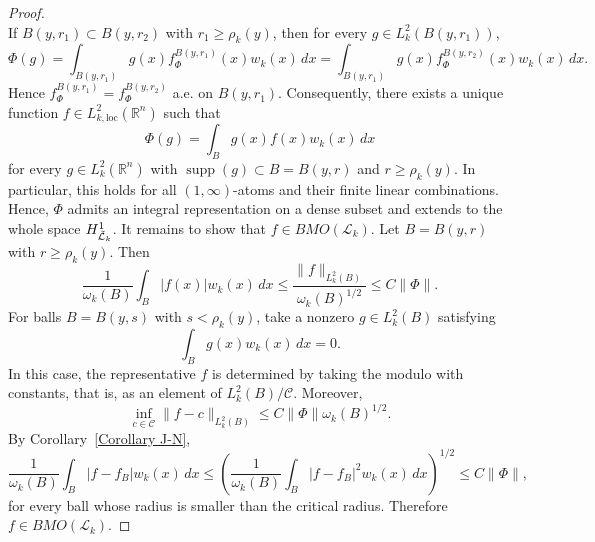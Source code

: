 \documentclass[11pt, reqno]{amsproc}
\theoremstyle{definition}
\theoremstyle{remark}
\numberwithin{equation}{section}
\begin{document}
\begin{proof}
\[\]
\noindent If $B(y,r_1) \subset B(y,r_2)$ with $r_1 \ge \rho_k(y)$, then for every $g \in L_k^2(B(y,r_1))$,
\[
\Phi(g)
= \int_{B(y,r_1)} g(x) f_\Phi^{B(y,r_1)}(x) w_k(x)\,dx
= \int_{B(y,r_1)} g(x) f_\Phi^{B(y,r_2)}(x) w_k(x)\,dx.
\]
Hence $f_\Phi^{B(y,r_1)} = f_\Phi^{B(y,r_2)}$ a.e. on $B(y,r_1)$. Consequently, there exists a unique function $f \in L_{k,\mathrm{loc}}^2(\mathbb{R}^n)$ such that
\[
\Phi(g) = \int_B g(x) f(x) w_k(x)\,dx
\]
for every $g \in L_k^2(\mathbb{R}^n)$ with $\operatorname{supp}(g)\subset B = B(y,r)$ and $r \ge \rho_k(y)$. In particular, this holds for all $(1,\infty)$-atoms and their finite linear combinations. Hence, $\Phi$ admits an integral representation on a dense subset and extends to the whole space $H_{\Tilde{\mathcal{L}}_k}^1$. It remains to show that $f \in BMO(\mathcal{L}_k)$. Let $B = B(y,r)$ with $r \geq \rho_k(y)$. Then
\[
\frac{1}{\omega_k(B)} \int_B |f(x)| w_k(x)\,dx
\le \frac{\|f\|_{L_k^2(B)}}{\omega_k(B)^{1/2}}
\le C \|\Phi\|.
\]
For balls $B = B(y,s)$ with $s < \rho_k(y)$, take a nonzero $g \in L_k^2(B)$ satisfying
\[
\int_B g(x) w_k(x)\,dx = 0.
\]
In this case, the representative $f$ is determined by taking the modulo with constants, that is, as an element of $L_k^2(B)/\mathcal C$. Moreover,
\[
\inf_{c \in \mathcal C} \|f-c\|_{L_k^2(B)}
\le C \|\Phi\| \omega_k(B)^{1/2}.
\]
By Corollary~\ref{Corollary J-N},
\[
\frac{1}{\omega_k(B)} \int_B |f-f_B| w_k(x)\,dx
\le \left(
\frac{1}{\omega_k(B)} \int_B |f-f_B|^2 w_k(x)\,dx
\right)^{1/2}
\le C \|\Phi\|,
\]
for every ball whose radius is smaller than the critical radius. Therefore $f \in BMO(\mathcal{L}_k)$.
\end{proof}
\end{document}
